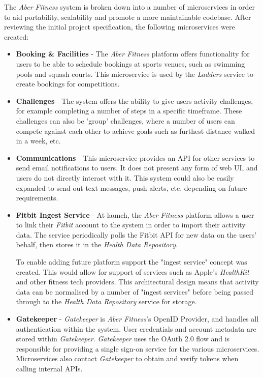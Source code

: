 The \textit{Aber Fitness} system is broken down into a number of microservices in order to aid portability, scalability and promote a more maintainable codebase. After reviewing the initial project specification, the following microservices were created:

\begin{itemize}

	\item \textbf{Booking \& Facilities} - The \textit{Aber Fitness} platform offers functionality for users to be able to schedule bookings at sports venues, such as swimming pools and squash courts. This microservice is used by the \textit{Ladders} service to create bookings for competitions.

	\item \textbf{Challenges} - The system offers the ability to give users activity challenges, for example completing a number of steps in a specific timeframe. These challenges can also be 'group' challenges, where a number of users can compete against each other to achieve goals such as furthest distance walked in a week, etc.

	\item \textbf{Communications} - This microservice provides an API for other services to send email notifications to users. It does not present any form of web UI, and users do not directly interact with it. This system could also be easily expanded to send out text messages, push alerts, etc. depending on future requirements.

	\item \textbf{Fitbit Ingest Service} - At launch, the \textit{Aber Fitness} platform allows a user to link their \textit{Fitbit} account to the system in order to import their activity data. The service periodically polls the Fitbit API for new data on the users' behalf, then stores it in the \textit{Health Data Repository}.
	
	\par To enable adding future platform support the "ingest service" concept was created. This would allow for support of services such as Apple's \textit{HealthKit} and other fitness tech providers. 
	This architectural design means that activity data can be normalised by a number of "ingest services" before being passed through to the \textit{Health Data Repository} service for storage. 

	\item \textbf{Gatekeeper} - \textit{Gatekeeper} is \textit{Aber Fitness}'s OpenID Provider, and handles all authentication within the system. User credentials and account metadata are stored within \textit{Gatekeeper}. \textit{Gatekeeper} uses the OAuth 2.0 flow and is responsible for providing a single sign-on service for the various microservices. Microservices also contact \textit{Gatekeeper} to obtain and verify tokens when calling internal APIs.


\end{itemize}
